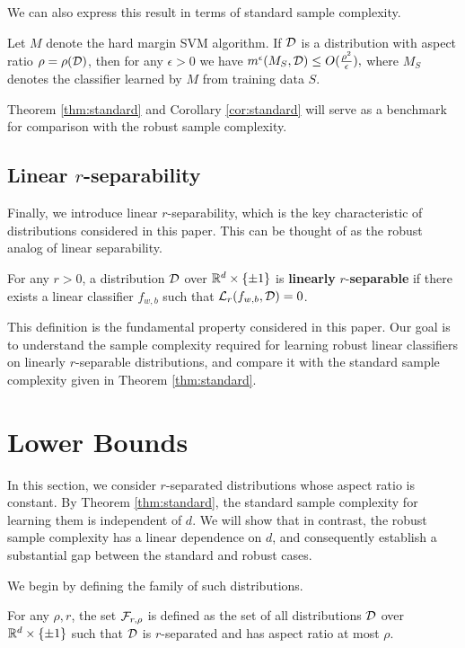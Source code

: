 We can also express this result in terms of standard sample complexity.
\begin{cor}\label{cor:standard}
Let $M$ denote the hard margin SVM algorithm. If ${\mathcal D}$ is a distribution with aspect ratio $\rho = \rho({\mathcal D})$, then for any $\epsilon > 0$ we have $m^\epsilon(M_S, {\mathcal D}) \leq O(\frac{\rho^2}{\epsilon}),$ where $M_S$ denotes the classifier learned by $M$ from training data $S$. 
\end{cor}

Theorem \ref{thm:standard} and Corollary \ref{cor:standard} will serve as a benchmark for comparison with the robust sample complexity.  
\subsection{Linear $r$-separability}

Finally, we introduce linear $r$-separability, which is the key characteristic of distributions considered in this paper. This can be thought of as the robust analog of linear separability.
\begin{defn}\label{defn:r_separability}
For any $r > 0$, a distribution ${\mathcal D}$ over $\mathbb R^d \times \{\pm 1\}$ is \textbf{linearly} $r$-\textbf{separable} if there exists a linear classifier $f_{w, b}$ such that $\mathcal L_r(f_{w, b}, {\mathcal D}) = 0$.
\end{defn}
This definition is the fundamental property considered in this paper. Our goal is to understand the sample complexity required for learning robust linear classifiers on linearly $r$-separable distributions, and compare it with the standard sample complexity given in Theorem \ref{thm:standard}.

\section{Lower Bounds}\label{sec:lower_bounds}

In this section, we consider $r$-separated distributions whose aspect ratio is constant. By Theorem \ref{thm:standard}, the standard sample complexity for learning them is independent of $d$. We will show that in contrast, the robust sample complexity has a linear dependence on $d$, and consequently establish a substantial gap between the standard and robust cases.

We begin by defining the family of such distributions.
\begin{defn}
For any $\rho, r$, the set ${\mathcal F}_{r, \rho}$ is defined as the set of all distributions ${\mathcal D}$ over $\mathbb R^d \times \{\pm 1\}$ such that ${\mathcal D}$ is $r$-separated and has aspect ratio at most $\rho$.
\end{defn} 

